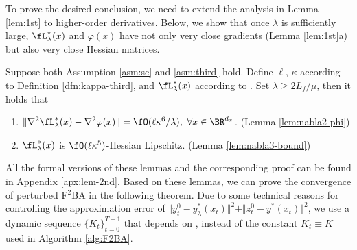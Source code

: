 \documentclass{article}
\begin{document}

To prove the desired conclusion, we need to extend the analysis in Lemma \ref{lem:1st}
to higher-order derivatives. Below, we show that once $\lambda$ is sufficiently large, $\fL_{\lambda}^*(x)$ and $\varphi(x)$ have not only very close gradients (Lemma \ref{lem:1st}a) but also very close Hessian matrices. 


\begin{lem} \label{lem:2rd}
Suppose both Assumption \ref{asm:sc} and \ref{asm:third} hold. Define $\ell$,  $\kappa$ according to Definition \ref{dfn:kappa-third}, and $\fL_{\lambda}^*(x)$ according to . Set $\lambda \ge 2L_f /\mu $, then it holds that 
\begin{enumerate}[label=\alph*.]
    \item $\Vert \nabla^2 \fL_{\lambda}^*(x) - \nabla^2 \varphi(x) \Vert = \fO(\ell \kappa^6 /\lambda),~\forall x \in \BR^{d_x}$. {\rm (Lemma \ref{lem:nabla2-phi})}
    \item $\fL_{\lambda}^*(x) $ is $\fO(\ell \kappa^5)$-Hessian Lipschitz. {\rm (Lemma \ref{lem:nabla3-bound})}
\end{enumerate}
\end{lem}

All the formal versions of these lemmas and the corresponding proof can be found in Appendix \ref{apx:lem-2nd}. Based on these lemmas, we can prove the convergence of perturbed F${}^2$BA in the following theorem. Due to some technical reasons for controlling the approximation error of $\Vert y_t^0 - y_{\lambda}^*(x_t) \Vert^2 + \Vert z_t^0 - y^*(x_t) \Vert^2$, we use a dynamic sequence $\{K_t\}_{t=0}^{T-1}$ that depends on , instead of the constant $K_t \equiv K$ used in Algorithm \ref{alg:F2BA}.
\end{document}
